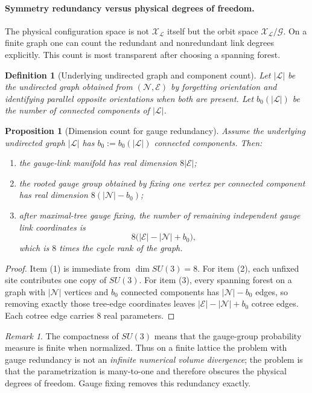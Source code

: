 \documentclass[11pt]{article}
\newtheorem{definition}[theorem]{Definition}
\newtheorem{proposition}[theorem]{Proposition}
\theoremstyle{remark}
\newtheorem{remark}[theorem]{Remark}
\newcommand{\mcN}{\mathcal N}
\newcommand{\mcE}{\mathcal E}
\newcommand{\mcG}{\mathcal G}
\newcommand{\mcX}{\mathscr X}
\begin{document}
\paragraph{Symmetry redundancy versus physical degrees of freedom.}
The physical configuration space is not $\mcX_\mathcal L$ itself but the orbit
space $\mcX_\mathcal L/\mcG$.  On a finite graph one can count the redundant and
nonredundant link degrees explicitly.  This count is most transparent after
choosing a spanning forest.

\begin{definition}[Underlying undirected graph and component count]
\label{def:components}
Let $|\mathcal L|$ be the undirected graph obtained from $(\mcN,\mcE)$ by
forgetting orientation and identifying parallel opposite orientations when both
are present.  Let $b_0(|\mathcal L|)$ be the number of connected components of
$|\mathcal L|$.
\end{definition}

\begin{proposition}[Dimension count for gauge redundancy]
\label{prop:dimension-count}
Assume the underlying undirected graph $|\mathcal L|$ has
$b_0:=b_0(|\mathcal L|)$ connected components.  Then:
\begin{enumerate}[leftmargin=1.5em]
\item the gauge-link manifold has real dimension $8|\mcE|$;
\item the rooted gauge group obtained by fixing one vertex per connected
component has real dimension $8(|\mcN|-b_0)$;
\item after maximal-tree gauge fixing, the number of remaining independent gauge
link coordinates is
\[
8\bigl(|\mcE|-|\mcN|+b_0\bigr),
\]
which is $8$ times the cycle rank of the graph.
\end{enumerate}
\end{proposition}
\begin{proof}
Item (1) is immediate from $\dim SU(3)=8$.  For item (2), each unfixed site
contributes one copy of $SU(3)$.  For item (3), every spanning forest on a
graph with $|\mcN|$ vertices and $b_0$ connected components has
$|\mcN|-b_0$ edges, so removing exactly those tree-edge coordinates leaves
$|\mcE|-|\mcN|+b_0$ cotree edges.  Each cotree edge carries $8$ real parameters.
\end{proof}

\begin{remark}
The compactness of $SU(3)$ means that the gauge-group probability measure is
finite when normalized.  Thus on a finite lattice the problem with gauge
redundancy is not an \emph{infinite numerical volume divergence}; the problem is
that the parametrization is many-to-one and therefore obscures the physical
degrees of freedom.  Gauge fixing removes this redundancy exactly.
\end{remark}
\end{document}
